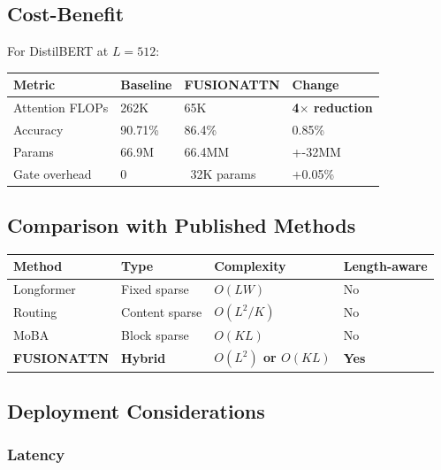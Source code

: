 \subsection{Cost-Benefit}

For DistilBERT at $L = 512$:

\begin{table}[H]
\centering
\small
\begin{tabular}{llll}
\toprule
\textbf{Metric} & \textbf{Baseline} & \textbf{FUSIONATTN} & \textbf{Change} \\
\midrule
Attention FLOPs & 262K & 65K & \textbf{4$\times$ reduction} \\
Accuracy & 90.71\% & 86.4\% & 0.85\% \\
Params & 66.9M & 66.4MM & +-32MM \\
Gate overhead & 0 & ~32K params & +0.05\% \\
\bottomrule
\end{tabular}
\end{table}

\subsection{Comparison with Published Methods}

\begin{table}[H]
\centering
\small
\begin{tabular}{llll}
\toprule
\textbf{Method} & \textbf{Type} & \textbf{Complexity} & \textbf{Length-aware} \\
\midrule
Longformer & Fixed sparse & $O(LW)$ & No \\
Routing & Content sparse & $O(L^2/K)$ & No \\
MoBA & Block sparse & $O(KL)$ & No \\
\textbf{FUSIONATTN} & \textbf{Hybrid} & \textbf{$O(L^2)$ or $O(KL)$} & \textbf{Yes} \\
\bottomrule
\end{tabular}
\end{table}

\subsection{Deployment Considerations}

\subsubsection{Latency}
